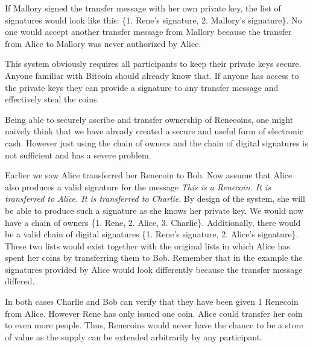 \documentclass[a4paper,12pt,oneside,openany]{book}
\begin{document}
If Mallory signed the transfer message with her own private key, the
list of signatures would look like this: \{1. Rene's signature,
2. Mallory's signature\}.  No one would accept another transfer message
from Mallory because the transfer from Alice to Mallory was never
authorized by Alice.

This system obviously requires all participants to keep their private
keys secure.  Anyone familiar with Bitcoin should already know that.  If
anyone has access to the private keys they can provide a signature to
any transfer message and effectively steal the coins.

Being able to securely ascribe and transfer ownership of Renecoins, one
might naively think that we have already created a secure and useful
form of electronic cash.  However just using the chain of owners and the
chain of digital signatures is not sufficient and has a severe problem.

  Earlier we saw Alice transferred her Renecoin to
Bob. Now assume that Alice also produces a valid signature for the
message \textit{This is a Renecoin. It is transferred to Alice. It is
  transferred to Charlie}.  By design of the system, she will be able to
produce such a signature as she knows her private key.  We would now
have a chain of owners  \{1. Rene,
2. Alice, 3. Charlie\}.  Additionally, there would be a valid chain of
digital signatures \{1. Rene's signature, 2. Alice's signature\}.  These
two lists would exist together with the original lists in which Alice
has spent her coins by transferring them to Bob.  Remember that in the
example  the signatures provided by Alice would
look differently because the transfer message differed.

In both cases Charlie and Bob can verify that they have been given 1
Renecoin from Alice.  However Rene has only issued one coin.  Alice
could transfer her coin to even more people.  Thus, Renecoins would
never have the chance to be a store of value as the supply can be
extended arbitrarily by any participant.
\end{document}
